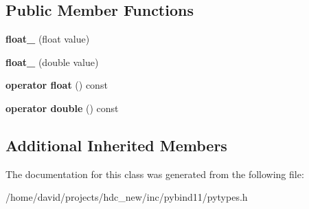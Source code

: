 \subsection*{Public Member Functions}
\begin{DoxyCompactItemize}
\item 
{\bfseries float\+\_\+} (float value)\hypertarget{classfloat___a33fc1fb35fa5bb113801fce4e202a9f7}{}\label{classfloat___a33fc1fb35fa5bb113801fce4e202a9f7}

\item 
{\bfseries float\+\_\+} (double value)\hypertarget{classfloat___aa92794ea99f3308860db22945d3d397a}{}\label{classfloat___aa92794ea99f3308860db22945d3d397a}

\item 
{\bfseries operator float} () const \hypertarget{classfloat___a675c05728b9ccf9b382e61915ca44512}{}\label{classfloat___a675c05728b9ccf9b382e61915ca44512}

\item 
{\bfseries operator double} () const \hypertarget{classfloat___ac7d47da438ab4cfe17a53dc6c099c6ad}{}\label{classfloat___ac7d47da438ab4cfe17a53dc6c099c6ad}

\end{DoxyCompactItemize}
\subsection*{Additional Inherited Members}


The documentation for this class was generated from the following file\+:\begin{DoxyCompactItemize}
\item 
/home/david/projects/hdc\+\_\+new/inc/pybind11/pytypes.\+h\end{DoxyCompactItemize}

